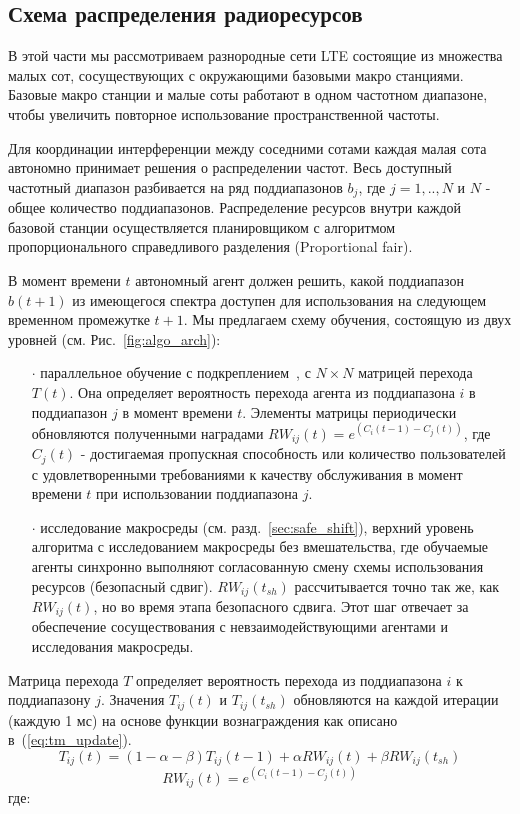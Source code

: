 \subsection{Схема распределения радиоресурсов}
В этой части мы рассмотриваем разнородные сети LTE состоящие из множества малых сот, сосуществующих с окружающими базовыми макро станциями. Базовые макро станции и малые соты работают в одном частотном диапазоне, чтобы увеличить повторное использование пространственной частоты.

Для координации интерференции между соседними сотами каждая малая сота автономно принимает решения о распределении частот. Весь доступный частотный диапазон разбивается на ряд поддиапазонов $b_{j}$, где $j=1, .., N$ и $N$ - общее количество поддиапазонов. Распределение ресурсов внутри каждой базовой станции осуществляется планировщиком с алгоритмом пропорционального справедливого разделения (Proportional fair).

В момент времени $t$ автономный агент должен решить, какой поддиапазон $b(t+1)$ из имеющегося спектра доступен для использования на следующем временном промежутке $t+1$. Мы предлагаем схему обучения, состоящую из двух уровней (см. Рис.~\ref{fig:algo_arch}):

\begin{itemize}
\item[$\cdot$] параллельное обучение с подкреплением~\cite{4445757}, с $N\times N$ матрицей перехода $T(t)$. Она определяет вероятность перехода агента из поддиапазона $i$ в поддиапазон $j$ в момент времени $t$. Элементы матрицы периодически обновляются полученными наградами $RW_{ij}(t) = e^{(C_i(t-1) - C_j(t))}$, где $C_j(t)$ - достигаемая пропускная способность или количество пользователей с удовлетворенными требованиями к качеству обслуживания в момент времени $t$ при использовании поддиапазона $j$.
\item[$\cdot$] исследование макросреды (см. разд.~\ref{sec:safe_shift}), верхний уровень алгоритма с исследованием макросреды без вмешательства, где обучаемые агенты синхронно выполняют согласованную смену схемы использования ресурсов (безопасный сдвиг). $RW_{ij}(t_{sh})$ рассчитывается точно так же, как $RW_{ij}(t)$, но во время этапа безопасного сдвига. Этот шаг отвечает за обеспечение сосуществования с невзаимодействующими агентами и исследования макросреды.
\end{itemize}

Матрица перехода $T$ определяет вероятность перехода из поддиапазона $i$ к поддиапазону $j$. Значения $T_{ij}(t)$ и $T_{ij}(t_{sh})$ обновляются на каждой итерации (каждую 1 мс) на основе функции вознаграждения как описано в~(\ref{eq:tm_update}).
\begin{equation}
    \label{eq:tm_update}
    T_{ij}(t) = (1-\alpha-\beta)T_{ij}(t-1) + \alpha RW_{ij}(t) + \beta RW_{ij}(t_{sh})
\end{equation}
\begin{equation}
    \label{eq:tm_update_c}
    RW_{ij}(t) = e^{(C_i(t-1) - C_j(t))}
\end{equation}
где:

